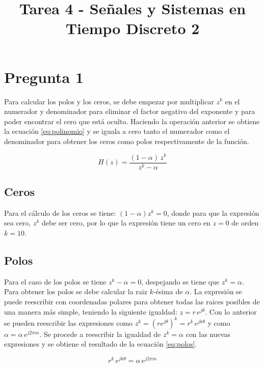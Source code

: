 \documentclass[conference]{IEEEtran}
\title{Tarea 4 - Señales y Sistemas en Tiempo Discreto 2}
\author{\IEEEauthorblockN{Zúñiga Ramírez Jose Eduardo}
\IEEEauthorblockA{Escuela de Ingeniería Electrónica \\
Instituto Tecnológico de Costa Rica \\
\{je.zuniga\}@estudiantec.cr}
}
\date{}
\begin{document}
\maketitle

\sloppy


\section{Pregunta 1}
Para calcular los polos y los ceros, se debe empezar por multiplicar $z^{k}$ en el numerador y denominador 
para eliminar el factor negativo del exponente y para poder encontrar el cero que está oculto. Haciendo la 
operación anterior se obtiene la ecuación \ref{eq:polinomio} y se iguala a cero tanto el numerador como el 
denominador para obtener los ceros como polos respectivamente de la función.

\begin{equation}
H(z) = \frac{(1-\alpha)\,z^{k}}{z^{k} - \alpha}
\label{eq:polinomio}
\end{equation}

\subsection{Ceros}
Para el cálculo de los ceros se tiene: $(1-\alpha)z^k = 0$, donde para que la expresión sea cero, $z^{k}$ 
debe ser cero, por lo que la expresión tiene un cero en $z = 0$ de orden $k=10$.

\subsection{Polos}
Para el caso de los polos se tiene $z^{k} - \alpha = 0$, despejando se tiene que  $z^{k} = \alpha$. Para 
obtener los polos se debe calcular la raiz $k$-ésima de $\alpha$. La expresión se puede reescribir con 
coordenadas polares para obtener todas las raices posibles de una manera más simple, teniendo la siguiente 
igualdad: $z = r\,e^{j\theta}$. Con lo anterior se pueden reescribir las expresiones como $z^k = \left(r e^{j\theta}\right)^k = r^k\, e^{jk\theta}$ 
y como $\alpha = \alpha\, e^{j2\pi m}$. Se procede a reescribir la igualdad de $z^{k} = \alpha$ con las 
nuevas expresiones y se obtiene el resultado de la ecuación \ref{eq:polos}.

\begin{equation}
r^k\, e^{jk\theta} = \alpha\, e^{j2\pi m}
\label{eq:polos}
\end{equation}
\end{document}
